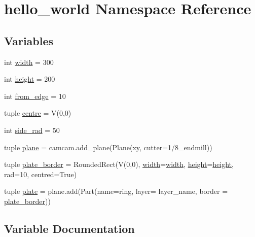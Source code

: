 \hypertarget{namespacehello__world}{}\section{hello\+\_\+world Namespace Reference}
\label{namespacehello__world}
\subsection*{Variables}
\begin{DoxyCompactItemize}
\item 
int \hyperlink{namespacehello__world_af811fa12a5ca10d11c44508bdb06132f}{width} = 300
\item 
int \hyperlink{namespacehello__world_aa435c61049b7ab873412b09bb73d043f}{height} = 200
\item 
int \hyperlink{namespacehello__world_ac1073c6a94e45d98f07b6271f6fa5e97}{from\+\_\+edge} = 10
\item 
tuple \hyperlink{namespacehello__world_ae63f17007209859fdd46882dd44e6c91}{centre} = V(0,0)
\item 
int \hyperlink{namespacehello__world_a53f83f437455b27ae9b7e025862ec9f3}{side\+\_\+rad} = 50
\item 
tuple \hyperlink{namespacehello__world_ad9d0a598115e85f261abd4d004c02cb5}{plane} = camcam.\+add\+\_\+plane(Plane(\textquotesingle{}xy\textquotesingle{}, cutter=\textquotesingle{}1/8\+\_\+endmill\textquotesingle{}))
\item 
tuple \hyperlink{namespacehello__world_aae96ddc88251a81fdf48adb9742a0446}{plate\+\_\+border} = Rounded\+Rect(V(0,0), \hyperlink{namespacehello__world_af811fa12a5ca10d11c44508bdb06132f}{width}=\hyperlink{namespacehello__world_af811fa12a5ca10d11c44508bdb06132f}{width}, \hyperlink{namespacehello__world_aa435c61049b7ab873412b09bb73d043f}{height}=\hyperlink{namespacehello__world_aa435c61049b7ab873412b09bb73d043f}{height}, rad=10, centred=True)
\item 
tuple \hyperlink{namespacehello__world_a910fd85f0bafe7016c9ee6dd634d93fa}{plate} = plane.\+add(Part(name=\textquotesingle{}ring\textquotesingle{}, layer= \textquotesingle{}layer\+\_\+name\textquotesingle{}, border = \hyperlink{namespacehello__world_aae96ddc88251a81fdf48adb9742a0446}{plate\+\_\+border}))
\end{DoxyCompactItemize}


\subsection{Variable Documentation}
\hypertarget{namespacehello__world_ae63f17007209859fdd46882dd44e6c91}{}
